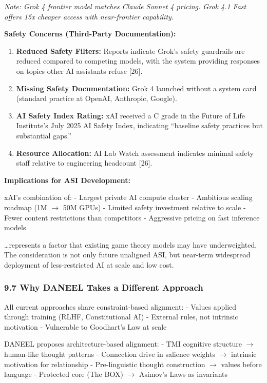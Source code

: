 \documentclass[
]{article}
\begin{document}
\emph{Note: Grok 4 frontier model matches Claude Sonnet 4 pricing. Grok
4.1 Fast offers 15x cheaper access with near-frontier capability.}

\textbf{Safety Concerns (Third-Party Documentation):}

\begin{enumerate}
\def\labelenumi{\arabic{enumi}.}
\item
  \textbf{Reduced Safety Filters:} Reports indicate Grok's safety
  guardrails are reduced compared to competing models, with the system
  providing responses on topics other AI assistants refuse {[}26{]}.
\item
  \textbf{Missing Safety Documentation:} Grok 4 launched without a
  system card (standard practice at OpenAI, Anthropic, Google).
\item
  \textbf{AI Safety Index Rating:} xAI received a C grade in the Future
  of Life Institute's July 2025 AI Safety Index, indicating ``baseline
  safety practices but substantial gaps.''
\item
  \textbf{Resource Allocation:} AI Lab Watch assessment indicates
  minimal safety staff relative to engineering headcount {[}26{]}.
\end{enumerate}

\textbf{Implications for ASI Development:}

xAI's combination of: - Largest private AI compute cluster - Ambitious
scaling roadmap (1M $\rightarrow$ 50M GPUs) - Limited safety investment relative to
scale - Fewer content restrictions than competitors - Aggressive pricing
on fast inference models

\ldots represents a factor that existing game theory models may have
underweighted. The consideration is not only future unaligned ASI, but
near-term widespread deployment of less-restricted AI at scale and low
cost.

\hypertarget{why-daneel-takes-a-different-approach}{%
\subsubsection{9.7 Why DANEEL Takes a Different
Approach}\label{why-daneel-takes-a-different-approach}}

All current approaches share constraint-based alignment: - Values
applied through training (RLHF, Constitutional AI) - External rules, not
intrinsic motivation - Vulnerable to Goodhart's Law at scale

DANEEL proposes architecture-based alignment: - TMI cognitive structure
$\rightarrow$ human-like thought patterns - Connection drive in salience weights $\rightarrow$
intrinsic motivation for relationship - Pre-linguistic thought
construction $\rightarrow$ values before language - Protected core (The BOX) $\rightarrow$
Asimov's Laws as invariants
\end{document}
